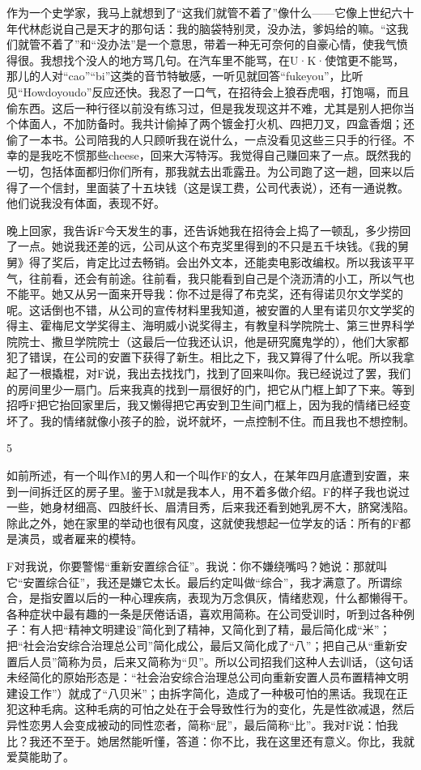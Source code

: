 作为一个史学家，我马上就想到了“这我们就管不着了”像什么——它像上世纪六十年代林彪说自己是天才的那句话：我的脑袋特别灵，没办法，爹妈给的嘛。“这我们就管不着了”和“没办法”是一个意思，带着一种无可奈何的自豪心情，使我气愤得很。我想找个没人的地方骂几句。在汽车里不能骂，在U·K·使馆更不能骂，那儿的人对“cao”“bi”这类的音节特敏感，一听见就回答“fukeyou”，比听见“Howdoyoudo”反应还快。我忍了一口气，在招待会上狼吞虎咽，打饱嗝，而且偷东西。这后一种行径以前没有练习过，但是我发现这并不难，尤其是别人把你当个体面人，不加防备时。我共计偷掉了两个镀金打火机、四把刀叉，四盒香烟；还偷了一本书。公司陪我的人只顾听我在说什么，一点没看见这些三只手的行径。不幸的是我吃不惯那些cheese，回来大泻特泻。我觉得自己赚回来了一点。既然我的一切，包括体面都归你们所有，那我就去出乖露丑。为公司跑了这一趟，回来以后得了一个信封，里面装了十五块钱（这是误工费，公司代表说），还有一通说教。他们说我没有体面，表现不好。 

晚上回家，我告诉F今天发生的事，还告诉她我在招待会上捣了一顿乱，多少捞回了一点。她说我还差的远，公司从这个布克奖里得到的不只是五千块钱。《我的舅舅》得了奖后，肯定比过去畅销。会出外文本，还能卖电影改编权。所以我该平平气，往前看，还会有前途。往前看，我只能看到自己是个浇沥清的小工，所以气也不能平。她又从另一面来开导我：你不过是得了布克奖，还有得诺贝尔文学奖的呢。这话倒也不错，从公司的宣传材料里我知道，被安置的人里有诺贝尔文学奖的得主、霍梅尼文学奖得主、海明威小说奖得主，有教皇科学院院士、第三世界科学院院士、撒旦学院院士（这最后一位我还认识，他是研究魔鬼学的），他们大家都犯了错误，在公司的安置下获得了新生。相比之下，我又算得了什么呢。所以我拿起了一根撬棍，对F说，我出去找找门，找到了回来叫你。我已经说过了罢，我们的房间里少一扇门。后来我真的找到一扇很好的门，把它从门框上卸了下来。等到招呼F把它抬回家里后，我又懒得把它再安到卫生间门框上，因为我的情绪已经变坏了。我的情绪就像小孩子的脸，说坏就坏，一点控制不住。而且我也不想控制。 

5 

如前所述，有一个叫作M的男人和一个叫作F的女人，在某年四月底遭到安置，来到一间拆迁区的房子里。鉴于M就是我本人，用不着多做介绍。F的样子我也说过一些，她身材细高、四肢纤长、眉清目秀，后来我还看到她乳房不大，脐窝浅陷。除此之外，她在家里的举动也很有风度，这就使我想起一位学友的话：所有的F都是演员，或者雇来的模特。 

F对我说，你要警惕“重新安置综合征”。我说：你不嫌绕嘴吗？她说：那就叫它“安置综合征”，我还是嫌它太长。最后约定叫做“综合”，我才满意了。所谓综合，是指安置以后的一种心理疾病，表现为万念俱灰，情绪悲观，什么都懒得干。各种症状中最有趣的一条是厌倦话语，喜欢用简称。在公司受训时，听到过各种例子：有人把“精神文明建设”简化到了精神，又简化到了精，最后简化成“米”；把“社会治安综合治理总公司”简化成公，最后又简化成了“八”；把自己从“重新安置后人员”简称为员，后来又简称为“贝”。所以公司招我们这种人去训话，（这句话未经简化的原始形态是：“社会治安综合治理总公司向重新安置人员布置精神文明建设工作”）就成了“八贝米”；由拆字简化，造成了一种极可怕的黑话。我现在正犯这种毛病。这种毛病的可怕之处在于会导致性行为的变化，先是性欲减退，然后异性恋男人会变成被动的同性恋者，简称“屁”，最后简称“比”。我对F说：怕我比？我还不至于。她居然能听懂，答道：你不比，我在这里还有意义。你比，我就爱莫能助了。 

